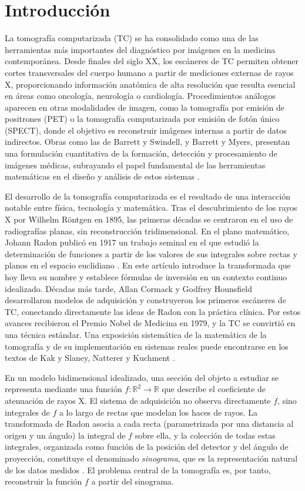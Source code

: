\chapter*{Introducción}

La tomografía computarizada (TC) se ha consolidado como una de las herramientas más importantes del diagnóstico por imágenes en la medicina contemporánea. Desde finales del siglo XX, los escáneres de TC permiten obtener cortes transversales del cuerpo humano a partir de mediciones externas de rayos X, proporcionando información anatómica de alta resolución que resulta esencial en áreas como oncología, neurología o cardiología. Procedimientos análogos aparecen en otras modalidades de imagen, como la tomografía por emisión de positrones (PET) o la tomografía computarizada por emisión de fotón único (SPECT), donde el objetivo es reconstruir imágenes internas a partir de datos indirectos. Obras como las de Barrett y Swindell, y Barrett y Myers, presentan una formulación cuantitativa de la formación, detección y procesamiento de imágenes médicas, subrayando el papel fundamental de las herramientas matemáticas en el diseño y análisis de estos sistemas \cite{barrett_swindell1996,barrett_myers2013}.

El desarrollo de la tomografía computarizada es el resultado de una interacción notable entre física, tecnología y matemática. Tras el descubrimiento de los rayos X por Wilhelm Röntgen en 1895, las primeras décadas se centraron en el uso de radiografías planas, sin reconstrucción tridimensional. En el plano matemático, Johann Radon publicó en 1917 un trabajo seminal en el que estudió la determinación de funciones a partir de los valores de sus integrales sobre rectas y planos en el espacio euclidiano \cite{radon1917}. En este artículo introduce la transformada que hoy lleva su nombre y establece fórmulas de inversión en un contexto continuo idealizado. Décadas más tarde, Allan Cormack y Godfrey Hounsfield desarrollaron modelos de adquisición y construyeron los primeros escáneres de TC, conectando directamente las ideas de Radon con la práctica clínica. Por estos avances recibieron el Premio Nobel de Medicina en 1979, y la TC se convirtió en una técnica estándar. Una exposición sistemática de la matemática de la tomografía y de su implementación en sistemas reales puede encontrarse en los textos de Kak y Slaney, Natterer y Kuchment \cite{kak_slaney1988,natterer2001,kuchment2014}.

En un modelo bidimensional idealizado, una sección del objeto a estudiar se representa mediante una función $f : \mathbb{R}^{2} \to \mathbb{R}$ que describe el coeficiente de atenuación de rayos X. El sistema de adquisición no observa directamente $f$, sino integrales de $f$ a lo largo de rectas que modelan los haces de rayos. La transformada de Radon asocia a cada recta (parametrizada por una distancia al origen y un ángulo) la integral de $f$ sobre ella, y la colección de todas estas integrales, organizada como función de la posición del detector y del ángulo de proyección, constituye el denominado \emph{sinograma}, que es la representación natural de los datos medidos \cite{kak_slaney1988,kuchment2014,natterer2001}. El problema central de la tomografía es, por tanto, reconstruir la función $f$ a partir del sinograma.

